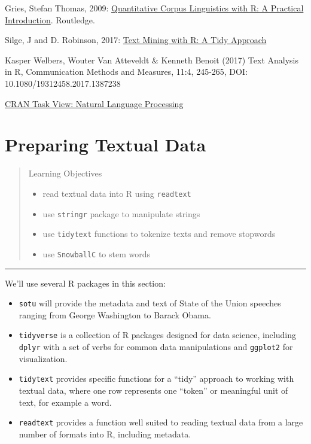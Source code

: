 \documentclass[]{book}
\providecommand{\tightlist}{%
  \setlength{\itemsep}{0pt}\setlength{\parskip}{0pt}}
\begin{document}
Gries, Stefan Thomas, 2009: \href{http://www.stgries.info/research/qclwr/qclwr.html}{Quantitative Corpus Linguistics with R: A Practical Introduction}. Routledge.

Silge, J and D. Robinson, 2017: \href{http://tidytextmining.com/}{Text Mining with R: A Tidy Approach}

Kasper Welbers, Wouter Van Atteveldt \& Kenneth Benoit (2017) Text Analysis in R, Communication Methods and Measures, 11:4, 245-265, DOI: 10.1080/19312458.2017.1387238

\href{https://CRAN.R-project.org/view=NaturalLanguageProcessing}{CRAN Task View: Natural Language Processing}

\hypertarget{textprep}{%
\chapter{Preparing Textual Data}\label{textprep}}

\begin{quote}
Learning Objectives

\begin{itemize}
\tightlist
\item
  read textual data into R using \texttt{readtext}
\item
  use \texttt{stringr} package to manipulate strings
\item
  use \texttt{tidytext} functions to tokenize texts and remove stopwords
\item
  use \texttt{SnowballC} to stem words
\end{itemize}
\end{quote}

\begin{center}\rule{0.5\linewidth}{\linethickness}\end{center}

We'll use several R packages in this section:

\begin{itemize}
\tightlist
\item
  \texttt{sotu} will provide the metadata and text of State of the Union speeches ranging from George Washington to Barack Obama.
\item
  \texttt{tidyverse} is a collection of R packages designed for data science, including \texttt{dplyr} with a set of verbs for common data manipulations and \texttt{ggplot2} for visualization.
\item
  \texttt{tidytext} provides specific functions for a ``tidy'' approach to working with textual data, where one row represents one ``token'' or meaningful unit of text, for example a word.
\item
  \texttt{readtext} provides a function well suited to reading textual data from a large number of formats into R, including metadata.
\end{itemize}
\end{document}
